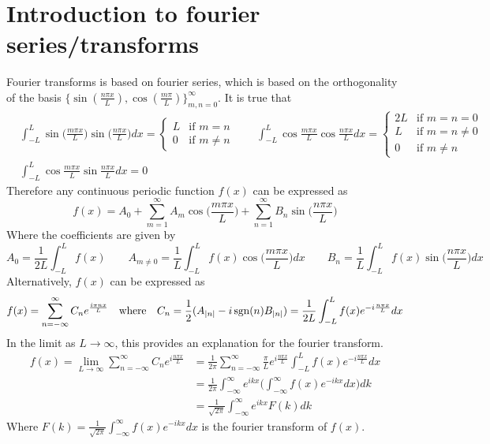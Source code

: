 \documentclass{article}
\begin{document}
\section{Introduction to fourier series/transforms}
Fourier transforms is based on fourier series, which is based on the orthogonality of the basis $\{\sin(\frac{n\pi x}{L}), \cos(\frac{m\pi}{L})\}_{m,n=0}^\infty$. It is true that 
\begin{align*}
&\int_{-L}^L \sin\big(\frac{m\pi x}{L}\big)\sin\big(\frac{n\pi x}{L}\big) dx = \begin{cases} L & \text{if } m=n \\
0 & \text{if } m\neq n
\end{cases} \qquad
\int_{-L}^L \cos\frac{m\pi x}{L}\cos\frac{n\pi x}{L} dx = \begin{cases} 2L & \text{if } m=n=0 \\
L & \text{if } m=n\neq 0\\
0 & \text{if } m\neq n
\end{cases} \\
&\int_{-L}^L \cos\frac{m\pi x}{L}\sin\frac{n\pi x}{L} dx = 0
\end{align*}
Therefore any continuous periodic function $f(x)$ can be expressed as 
\begin{equation*}
f(x) = A_0 + \sum_{m=1}^\infty A_m\cos\big(\frac{m\pi x}{L}\big) +  \sum_{n=1}^\infty B_n\sin\big(\frac{n\pi x}{L}\big)
\end{equation*}
Where the coefficients are given by 
\begin{equation*}
A_0 = \frac{1}{2L}\int_{-L}^L f(x) \qquad A_{m\neq 0} = \frac{1}{L}\int_{-L}^L f(x) \cos\big(\frac{m\pi x}{L}\big) dx \qquad B_n = \frac{1}{L}\int_{-L}^L f(x) \sin\big(\frac{n\pi x}{L}\big) dx 
\end{equation*}
Alternatively, $f(x)$ can be expressed as 
\begin{equation*}
f(x) = \sum_{n=-\infty}^\infty C_n e^{\frac{i\pi n x}{L}} \quad \text{where} \quad C_n = \frac{1}{2}(A_{|n|} - i\operatorname{sgn}(n) B_{|n|}) = \frac{1}{2L}\int_{-L}^L f(x) e^{-i\frac{n\pi x}{L}} dx
\end{equation*}
In the limit as $L \rightarrow \infty$, this provides an explanation for the fourier transform.
\begin{align*}
f(x) = \lim_{L\rightarrow\infty} \sum_{n=-\infty}^\infty C_n e^{i\frac{n\pi x}{L}} &= \frac{1}{2\pi}\sum_{n=-\infty}^\infty \frac{\pi}{L} e^{i\frac{n\pi x}{L}} \int_{-L}^L f(x) e^{-i\frac{n\pi x}{L}} dx \\
&=  \frac{1}{2\pi}\int_{-\infty}^\infty e^{ikx} \bigg(\int_{-\infty}^\infty f(x)e^{-ikx} dx \bigg)dk \\
&= \frac{1}{\sqrt{2\pi}}\int_{-\infty}^\infty e^{ikx} F(k) dk
\end{align*}
Where $F(k) = \frac{1}{\sqrt{2\pi}}\int_{-\infty}^\infty f(x)e^{-ikx} dx$ is the fourier transform of $f(x)$.
\end{document}
